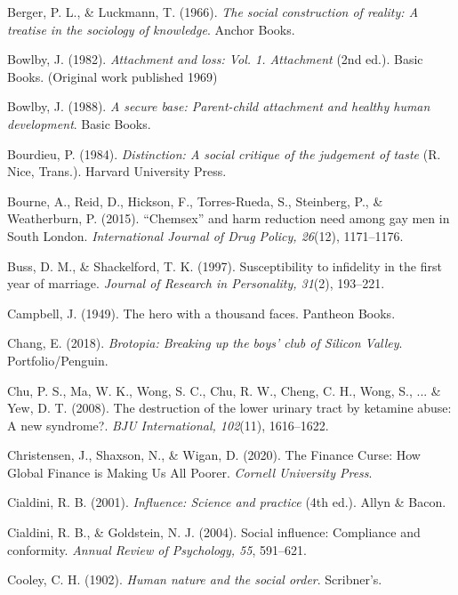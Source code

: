 \begin{thebibliography}{}
    Berger, P. L., \& Luckmann, T. (1966). \textit{The social construction of reality: A treatise in the sociology of knowledge}. Anchor Books.

    Bowlby, J. (1982). \textit{Attachment and loss: Vol. 1. Attachment} (2nd ed.). Basic Books. (Original work published 1969)

    Bowlby, J. (1988). \textit{A secure base: Parent-child attachment and healthy human development}. Basic Books.
    
    Bourdieu, P. (1984). \textit{Distinction: A social critique of the judgement of taste} (R. Nice, Trans.). Harvard University Press.

    Bourne, A., Reid, D., Hickson, F., Torres-Rueda, S., Steinberg, P., \& Weatherburn, P. (2015). “Chemsex” and harm reduction need among gay men in South London. \textit{International Journal of Drug Policy, 26}(12), 1171–1176.
    
    Buss, D. M., \& Shackelford, T. K. (1997). Susceptibility to infidelity in the first year of marriage. \textit{Journal of Research in Personality, 31}(2), 193–221.

    Campbell, J. (1949). The hero with a thousand faces. Pantheon Books.   

    Chang, E. (2018). \textit{Brotopia: Breaking up the boys' club of Silicon Valley}. Portfolio/Penguin.

    Chu, P. S., Ma, W. K., Wong, S. C., Chu, R. W., Cheng, C. H., Wong, S., ... \& Yew, D. T. (2008). The destruction of the lower urinary tract by ketamine abuse: A new syndrome?. \textit{BJU International, 102}(11), 1616–1622.

    Christensen, J., Shaxson, N., \& Wigan, D. (2020). The Finance Curse: How Global Finance is Making Us All Poorer. \textit{Cornell University Press}.

    Cialdini, R. B. (2001). \textit{Influence: Science and practice} (4th ed.). Allyn \& Bacon.
    
    Cialdini, R. B., \& Goldstein, N. J. (2004). Social influence: Compliance and conformity. \textit{Annual Review of Psychology, 55}, 591–621.

    Cooley, C. H. (1902). \textit{Human nature and the social order}. Scribner’s.


\end{thebibliography}

